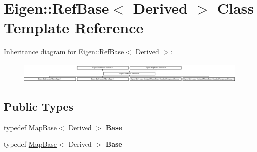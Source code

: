 \hypertarget{class_eigen_1_1_ref_base}{}\section{Eigen\+:\+:Ref\+Base$<$ Derived $>$ Class Template Reference}
\label{class_eigen_1_1_ref_base}
Inheritance diagram for Eigen\+:\+:Ref\+Base$<$ Derived $>$\+:\begin{figure}[H]
\begin{center}
\leavevmode
\includegraphics[height=1.009615cm]{class_eigen_1_1_ref_base}
\end{center}
\end{figure}
\subsection*{Public Types}
\begin{DoxyCompactItemize}
\item 
\mbox{\label{class_eigen_1_1_ref_base_af4cf7b03dd4f89bf2caf76776923d8ab}} 
typedef \hyperlink{class_eigen_1_1_map_base}{Map\+Base}$<$ Derived $>$ {\bfseries Base}
\item 
\mbox{\label{class_eigen_1_1_ref_base_af4cf7b03dd4f89bf2caf76776923d8ab}} 
typedef \hyperlink{class_eigen_1_1_map_base}{Map\+Base}$<$ Derived $>$ {\bfseries Base}
\end{DoxyCompactItemize}
